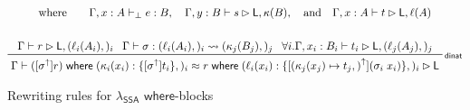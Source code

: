 \documentclass[acmsmall,screen,review]{acmart}
\newcommand{\ms}[1]{\ensuremath{\mathsf{#1}}}
\newcommand{\lto}{:}
\newcommand{\where}[2]{#1\;\ms{where}\;#2}
\newcommand{\wbranch}[3]{#1(#2) \lto \{#3\}}
\newcommand{\upg}[1]{{#1}^\uparrow}
\newcommand{\bhyp}[2]{#1 : #2}
\newcommand{\lhyp}[2]{#1(#2)}
\newcommand{\rle}[1]{{\scriptsize\textsf{#1}}}
\newcommand{\hasty}[4]{#1 \vdash_{#2} #3: {#4}}
\newcommand{\haslb}[3]{#1 \vdash #2 \rhd #3}
\newcommand{\lbsubst}[4]{#1 \vdash #2: #3 \rightsquigarrow #4}
\newcommand{\teqv}{\approx}
\newcommand{\lbeq}[4]{#1 \vdash #2 \teqv #3 \rhd {#4}}
\newcommand{\isotopessa}{\(\lambda_{\ms{SSA}}\)}
\begin{document}
\begin{figure}
\begin{gather*}
      \text{where} \qquad
      {\hasty{\Gamma, \bhyp{x}{A}}{\bot}{e}{B}}, \quad
      {\haslb{\Gamma, \bhyp{y}{B}}{s}{\ms{L}, \kappa(B)}}, \quad \text{and} \quad
      {\haslb{\Gamma, \bhyp{x}{A}}{t}{\ms{L}, \ell(A)}}
      \\
      \\
      \prftree[r]{\rle{dinat}}
        {
          \haslb{\Gamma}{r}{\ms{L}, (\lhyp{\ell_i}{A_i},)_i}
        }{
          \lbsubst{\Gamma}{\sigma}{(\lhyp{\ell_i}{A_i},)_i}{(\lhyp{\kappa_j}{B_j},)_j}
        }{
          \forall i. \haslb{\Gamma, \bhyp{x_i}{B_i}}{t_i}{\ms{L}, (\lhyp{\ell_j}{A_j},)_j}
        }{
          \lbeq{\Gamma}
            {\where{([\upg{\sigma}]r)}{(\wbranch{\kappa_i}{x_i}{[\upg{\sigma}]t_i},)_i}}
            {\where{r}
              {(\wbranch{\ell_i}{x_i}{[\upg{(\kappa_j(x_j) \mapsto t_j,)}](\sigma_i\;x_i)},)_i}}
            {\ms{L}}
        }
  \end{gather*}
  \Description{}
  \caption{Rewriting rules for \isotopessa{} \ms{where}-blocks}
  \label{fig:ssa-where-rules}
\end{figure}
\end{document}
